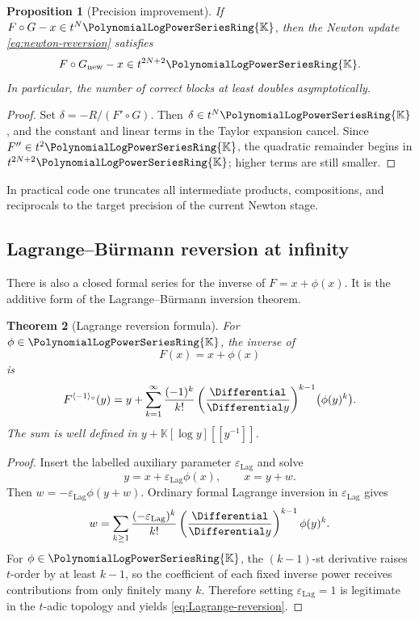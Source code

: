 \documentclass[11pt]{article}
\theoremstyle{pltheorem}
\newtheorem{theorem}{Theorem}[section]
\newtheorem{proposition}[theorem]{Proposition}
\newcommand{\K}{\mathbb K}
\newcommand{\PL}{\PolynomialLogPowerSeriesRing{\K}}
\newcommand{\rev}{\langle-1\rangle_{\circ}}
\newcommand{\compose}{\mathbin{\circ}}
\newcommand{\LagrangeAuxiliaryParameter}{\varepsilon_{\mathrm{Lag}}}
\begin{document}
\begin{proposition}[Precision improvement]\label{prop:newton-reversion-precision}
If \(F\compose G-x\in t^N\PL\), then the Newton update
\cref{eq:newton-reversion} satisfies
\begin{equation}\label{eq:newton-reversion-precision}
 F\compose G_{\mathrm{new}}-x\in t^{2N+2}\PL.
\end{equation}
In particular, the number of correct blocks at least doubles asymptotically.
\end{proposition}

\begin{proof}
Set \(\delta=-R/(F'\compose G)\).  Then \(\delta\in t^N\PL\), and the constant and linear terms in the Taylor expansion cancel.  Since \(F''\in t^2\PL\), the quadratic remainder begins in
\(t^{2N+2}\PL\); higher terms are still smaller.
\end{proof}

In practical code one truncates all intermediate products, compositions, and reciprocals to the target precision of the current Newton stage.

\subsection{Lagrange--B\"urmann reversion at infinity}

There is also a closed formal series for the inverse of \(F=x+\phi(x)\).  It is the additive form of the Lagrange--B\"urmann inversion theorem.

\begin{theorem}[Lagrange reversion formula]\label{thm:Lagrange-reversion}
For \(\phi\in\PL\), the inverse of
\begin{equation}\label{eq:F-x-plus-phi}
 F(x)=x+\phi(x)
\end{equation}
is
\begin{equation}\label{eq:Lagrange-reversion}
 F^{\rev}(y)
 =y+\sum_{k=1}^{\infty}\frac{(-1)^k}{k!}
 \left(\frac{\Differential}{\Differential y}\right)^{k-1}\!\bigl(\phi(y)^k\bigr).
\end{equation}
The sum is well defined in \(y+\K[\log y][[y^{-1}]]\).
\end{theorem}

\begin{proof}
Insert the labelled auxiliary parameter \(\LagrangeAuxiliaryParameter\) and solve
\[
 y=x+\LagrangeAuxiliaryParameter\phi(x),
 \qquad x=y+w.
\]
Then \(w=-\LagrangeAuxiliaryParameter\phi(y+w)\).  Ordinary formal Lagrange inversion in \(\LagrangeAuxiliaryParameter\) gives
\[
 w=\sum_{k\ge1}\frac{(-\LagrangeAuxiliaryParameter)^k}{k!}
 \left(\frac{\Differential}{\Differential y}\right)^{k-1}\phi(y)^k.
\]
For \(\phi\in\PL\), the \((k-1)\)-st derivative raises \(t\)-order by at least \(k-1\), so the coefficient of each fixed inverse power receives contributions from only finitely many \(k\).  Therefore setting \(\LagrangeAuxiliaryParameter=1\) is legitimate in the \(t\)-adic topology and yields \cref{eq:Lagrange-reversion}.
\end{proof}
\end{document}
